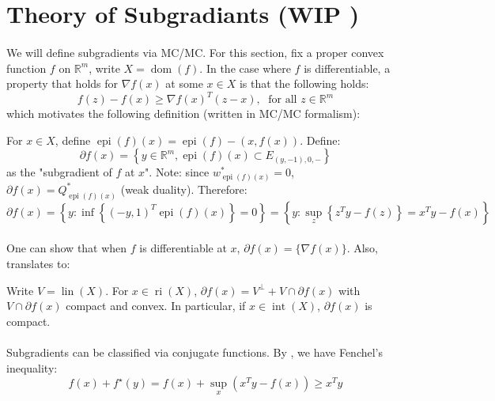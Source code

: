 \section{Theory of Subgradiants (WIP \faWrench)}
\label{sect:046}

\paragraph{}We will define subgradients via MC/MC. For this section, fix a proper convex function $f$ on $\mathbb{R}^m$, write $X=\operatorname{dom}(f)$. In the case where $f$ is differentiable, a property that holds for $\nabla f(x)$ at some $x\in X$ is that the following holds:
\[
	f(z)-f(x)\geq \nabla f(x)^T(z-x),\; \text{ for all }z\in \mathbb{R}^m
\]
which motivates the following definition (written in MC/MC formalism):

\begin{defn}[Subgradients]\label{defn-subgradients}
	For $x\in X$, define $\operatorname{epi}(f)(x) = \operatorname{epi}(f) - (x,f(x))$. Define:
	\[
		\partial f(x) = \left\{
		y\in \mathbb{R}^m,
		\operatorname{epi}(f)(x)\subset E_{(y,-1),0,-}
		\right\}
	\]
	as the "subgradient of $f$ at $x$". Note: since $w^\ast_{\operatorname{epi}(f)(x)}=0$, $\partial f(x)=Q^\ast_{\operatorname{epi}(f)(x)}$ (weak duality). Therefore:
	\[
		\partial f(x) = \left\{y:\inf\left\{(-y,1)^T \operatorname{epi}(f)(x)\right\}=0\right\}=\left\{y:\sup_z \left\{ z^Ty-f(z)\right\}=x^Ty-f(x)\right\}
	\]
\end{defn}

\paragraph{}One can show that when $f$ is differentiable at $x$, $\partial f(x)=\{\nabla f(x)\}$. Also,  translates to:

\begin{prop}\label{prop:046-set-of-subgrad}
	Write $V=\operatorname{lin}(X)$. For $x\in \operatorname{ri}(X)$, $\partial f(x) = V^\perp + V\cap \partial f(x)$ with $V\cap \partial f(x)$ compact and convex. In particular, if $x\in \operatorname{int}(X)$, $\partial f(x)$ is compact.
\end{prop}

\paragraph{}Subgradients can be classified via conjugate functions. By , we have Fenchel's inequality:
\[
	f(x) + f^\star(y) = f(x) + \sup_{x}(x^Ty-f(x)) \geq x^Ty
\]

